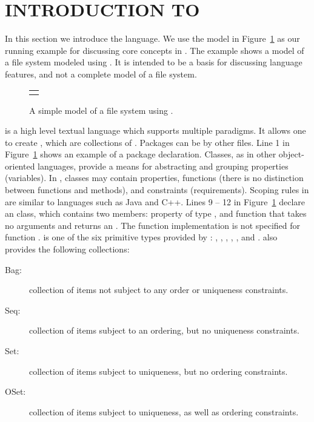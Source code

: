 \section{INTRODUCTION TO \Klang{}}
\label{sec:k-syntax}

In this section we introduce the \Klang{} language. We use the
\Klang{} model in Figure~\ref{fig:fs} as our running example for
discussing core concepts in \Klang{}. The example shows a model of a
file system modeled using \Klang{}. It is intended to be a basis for
discussing language features, and not a complete model of a file
system.

\begin{figure}
  \centering
  \begin{tabular}{c}
    \small
    
    \end{tabular}
  \vspace{0.2cm}
  \caption{A simple model of a file system using \Klang{}.}
  \label{fig:fs}
\end{figure}
  
\Klang{} is a high level textual language which supports multiple
paradigms. It allows one to create , which are
collections of . Packages can be  by
other \Klang{} files. Line 1 in Figure~\ref{fig:fs} shows an example
of a package declaration. Classes, as in other object-oriented
languages, provide a means for abstracting and grouping
properties (variables). In \Klang{}, classes may contain properties,
functions (there is no distinction between functions and methods), and
constraints (requirements). Scoping rules in \Klang{} are similar to
languages such as Java and C++. Lines 9 -- 12 in Figure~\ref{fig:fs}
declare an  class, which contains two members: property
 of type , and function  that takes
no arguments and returns an . The function implementation is
not specified for function .  is one of the
six primitive types provided by \Klang{}: , ,
, , , and . \Klang{}
also provides the following collections:

\begin{description}
\item [Bag:] collection of items not subject to any order
  or uniqueness constraints.
\item [Seq:] collection of items subject to an ordering, but
  no uniqueness constraints.
\item [Set:] collection of items subject to uniqueness, but no
  ordering constraints.
\item [OSet:] collection of items subject to uniqueness, as well as
  ordering constraints.
\end{description}

